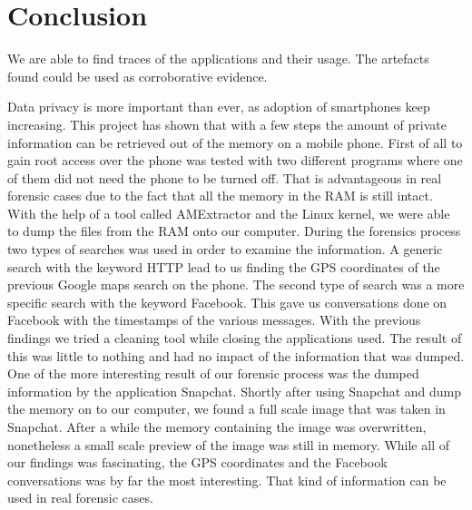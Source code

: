 \section{Conclusion}
We are able to find traces of the applications and their usage. The artefacts found could be used as corroborative evidence.

Data privacy is more important than ever, as adoption of smartphones keep increasing. This project has shown that with a few steps the amount of private information can be retrieved out of the memory on a mobile phone. First of all to gain root access over the phone was tested with two different programs where one of them did not need the phone to be turned off. That is advantageous in real forensic cases due to the fact that all the memory in the RAM is still intact. With the help of a tool called AMExtractor and the Linux kernel, we were able to dump the files from the RAM onto our computer. During the forensics process two types of searches was used in order to examine the information. A generic search with the keyword HTTP lead to us finding the GPS coordinates of the previous Google maps search on the phone. The second type of search was a more specific search with the keyword Facebook. This gave us conversations done on Facebook with the timestamps of the various messages. With the previous findings we tried a cleaning tool while closing the applications used. The result of this was little to nothing and had no impact of the information that was dumped. One of the more interesting result of our forensic process was the dumped information by the application Snapchat. Shortly after using Snapchat and dump the memory on to our computer, we found a full scale image that was taken in Snapchat. After a while the memory containing the image was overwritten, nonetheless a small scale preview of the image was still in memory. While all of our findings was fascinating, the GPS coordinates and the Facebook conversations was by far the most interesting. That kind of information can be used in real forensic cases.
